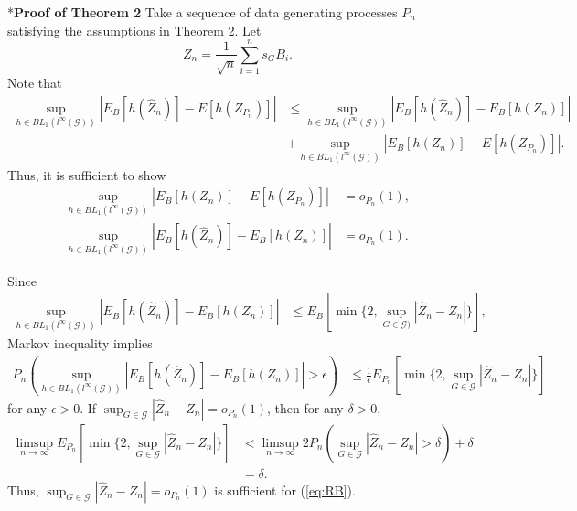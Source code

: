 \documentclass[12pt,oneside,reqno,english]{amsart}
\makeatletter
\renewcommand\subsection{\@startsection{subsection}{2}%
  \z@{-.5\linespacing\@plus-.7\linespacing}{.5\linespacing}%
  {\normalfont\scshape}}
\theoremstyle{definition}
\makeatother
\begin{document}
\subsection*{\bf{Proof of Theorem 2}}
Take a sequence of data generating processes $P_{n}$ satisfying the assumptions in Theorem 2. 
Let 
\[Z_{n}=\frac{1}{\sqrt{n}}\sum_{i=1}^{n}s_{G}B_{i}.\]
Note that 
\begin{align*}
\sup_{h\in BL_{1}(l^{\infty}(\mathcal{G}))}|E_{B}[h(\hat{Z}_{n})]-E[h(Z_{P_{n}})]|
&\leq \sup_{h\in BL_{1}(l^{\infty}(\mathcal{G}))}|E_{B}[h(\hat{Z}_{n})]-E_{B}[h(Z_{n})]|\\
&+\sup_{h\in BL_{1}(l^{\infty}(\mathcal{G}))}|E_{B}[h(Z_{n})]-E[h(Z_{P_{n}})]|.
\end{align*}
Thus, it is sufficient to show 
\begin{align}
\sup_{h\in BL_{1}(l^{\infty}(\mathcal{G}))}|E_{B}[h(Z_{n})]-E[h(Z_{P_{n}})]|&=o_{P_{n}}(1),\label{eq:asylinB}\\
\sup_{h\in BL_{1}(l^{\infty}(\mathcal{G}))}|E_{B}[h(\hat{Z}_{n})]-E_{B}[h(Z_{n})]|&=o_{P_{n}}(1).\label{eq:RB}
\end{align}

Since 
\begin{align*}
\sup_{h\in BL_{1}(l^{\infty}(\mathcal{G}))}|E_{B}[h(\hat{Z}_{n})]-E_{B}[h(Z_{n})]|
&\leq E_{B}[\min\{2, \sup_{G\in \mathcal{G})}|\hat{Z}_{n}-Z_{n}|\}],
\end{align*}
Markov inequality implies 
\begin{align*}
P_{n}(\sup_{h\in BL_{1}(l^{\infty}(\mathcal{G}))}|E_{B}[h(\hat{Z}_{n})]-E_{B}[h(Z_{n})]|>\epsilon)
&\leq \frac{1}{\epsilon}E_{P_{n}}[\min\{2, \sup_{G\in \mathcal{G}}|\hat{Z}_{n}-Z_{n}|\}]
\end{align*}
for any $\epsilon>0$. If $\sup_{G\in \mathcal{G}}|\hat{Z}_{n}-Z_{n}|=o_{P_{n}}(1)$, then for any $\delta>0$, 
\begin{align*}
\limsup_{n\rightarrow\infty} E_{P_{n}}[\min\{2, \sup_{G\in \mathcal{G}}|\hat{Z}_{n}-Z_{n}|\}]&<\limsup_{n\rightarrow\infty}2P_{n}(\sup_{G\in \mathcal{G}}|\hat{Z}_{n}-Z_{n}|>\delta)+\delta\\
&=\delta.
\end{align*}
Thus, $\sup_{G\in \mathcal{G}}|\hat{Z}_{n}-Z_{n}|=o_{P_{n}}(1)$ is sufficient for (\ref{eq:RB}).
\end{document}
